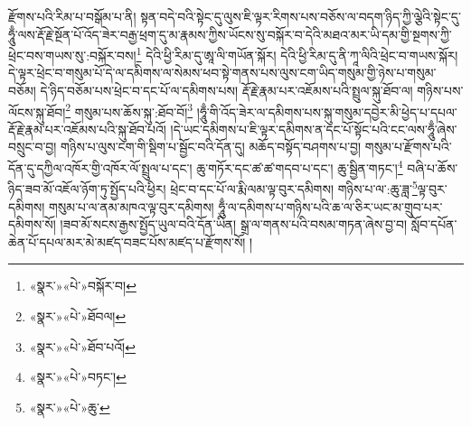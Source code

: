 རྫོགས་པའི་རིམ་པ་བསྒོམ་པ་ནི། སྟན་བདེ་བའི་སྟེང་དུ་ལུས་ཇི་ལྟར་རིགས་པས་བཅོས་ལ་བདག་ཉིད་ཀྱི་ལྕེའི་སྟེང་དུ་ཧཱུྃ་ལས་རྡོ་རྗེ་སྔོན་པོ་འོད་ཟེར་བརྒྱ་ཕྲག་དུ་མ་རྣམས་ཀྱིས་ཡོངས་སུ་བསྐོར་བ་དེའི་མཐའ་མར་ཡི་དམ་གྱི་སྔགས་ཀྱི་ཕྲེང་བས་གཡས་སུ་:བསྐོར་བས།\footnote{«སྣར་»«པེ་»བསྐོར་བ།} དེའི་ཕྱི་རིམ་དུ་ཨཱ་ལི་གཡོན་སྐོར། དེའི་ཕྱི་རིམ་དུ་ནི་ཀཱ་ལིའི་ཕྲེང་བ་གཡས་སྐོར། དེ་ལྟར་ཕྲེང་བ་གསུམ་པོ་དེ་ལ་དམིགས་ལ་སེམས་ཕབ་སྟེ་གནས་པས་ལུས་ངག་ཡིད་གསུམ་གྱི་ཉེས་པ་གསུམ་བཅོམ། དེ་ཉིད་བཅོམ་པས་ཕྲེང་བ་དང་པོ་ལ་དམིགས་པས། རྡོ་རྗེ་རྣམ་པར་འཇོམས་པའི་སྤྲུལ་སྐུ་ཐོབ་ལ། གཉིས་པས་ལོངས་སྐུ་ཐོབ།\footnote{«སྣར་»«པེ་»ཐོབལ།} གསུམ་པས་ཆོས་སྐུ་:ཐོབ་བོ།\footnote{«སྣར་»«པེ་»ཐོབ་པའོ།} །ཧཱུྃ་གི་འོད་ཟེར་ལ་དམིགས་པས་སྐུ་གསུམ་དབྱེར་མི་ཕྱེད་པ་དཔལ་རྡོ་རྗེ་རྣམ་པར་འཇོམས་པའི་སྐུ་ཐོབ་པའོ། །དེ་ཡང་དམིགས་པ་ཇི་ལྟར་དམིགས་ན་དང་པོ་སྟོང་པའི་ངང་ལས་ཧཱུྃ་ཞེས་བསྲུང་བ་བྱ། གཉིས་པ་ལུས་ངག་གི་སྡིག་པ་སྦྱོང་བའི་དོན་དུ། མཆོད་བསྟོད་བཤགས་པ་བྱ། གསུམ་པ་རྫོགས་པའི་དོན་དུ་དཀྱིལ་འཁོར་གྱི་འཁོར་ལོ་སྤྲུལ་པ་དང་། ཆུ་གཏོར་དང་ཚ་ཚ་གདབ་པ་དང་། ཆུ་སྦྱིན་གཏང་།\footnote{«སྣར་»«པེ་»བཏང་།} བཞི་པ་ཆོས་ཉིད་ཟབ་མོ་འཇོལ་ཉོག་ཏུ་སྤྱོད་པའི་ཕྱིར། ཕྲེང་བ་དང་པོ་ལ་རྨི་ལམ་ལྟ་བུར་དམིགས། གཉིས་པ་ལ་:ཆུ་ཟླ་\footnote{«སྣར་»«པེ་»ཆུ་}ལྟ་བུར་དམིགས། གསུམ་པ་ལ་ནམ་མཁའ་ལྟ་བུར་དམིགས། ཧཱུྃ་ལ་དམིགས་པ་གཉིས་པའི་ཆ་ལ་ཅིར་ཡང་མ་གྲུབ་པར་དམིགས་སོ། །ཟབ་མོ་སངས་རྒྱས་སྤྱོད་ཡུལ་བའི་དོན་ཡིན། སྒྲ་ལ་གནས་པའི་བསམ་གཏན་ཞེས་བྱ་བ། སློབ་དཔོན་ཆེན་པོ་དཔལ་མར་མེ་མཛད་བཟང་པོས་མཛད་པ་རྫོགས་སོ། ། 